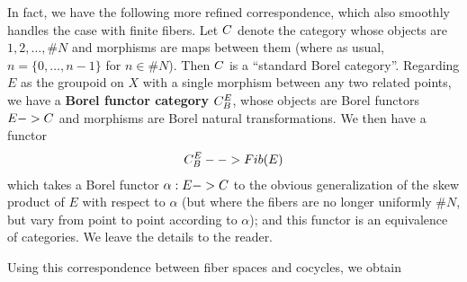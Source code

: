 \documentclass[11pt]{article}
\newcommand*\defn{\textbf}
\begin{document}
\begin{remark}
In fact, we have the following more refined correspondence, which also smoothly handles the case with finite fibers.  Let $\*C$ denote the category whose objects are $1, 2, \dotsc, \#N$ and morphisms are maps between them (where as usual, $n = \{0, \dotsc, n-1\}$ for $n \in \#N$).  Then $\*C$ is a ``standard Borel category''.  Regarding $E$ as the groupoid on $X$ with a single morphism between any two related points, we have a \defn{Borel functor category} $\*C^E_B$, whose objects are Borel functors $E -> \*C$ and morphisms are Borel natural transformations.  We then have a functor
\begin{align*}
\*C^E_B --> \*{Fib}(E)
\end{align*}
which takes a Borel functor $\alpha : E -> \*C$ to the obvious generalization of the skew product of $E$ with respect to $\alpha$ (but where the fibers are no longer uniformly $\#N$, but vary from point to point according to $\alpha$); and this functor is an equivalence of categories.  We leave the details to the reader.
\end{remark}

Using this correspondence between fiber spaces and cocycles, we obtain
\end{document}

